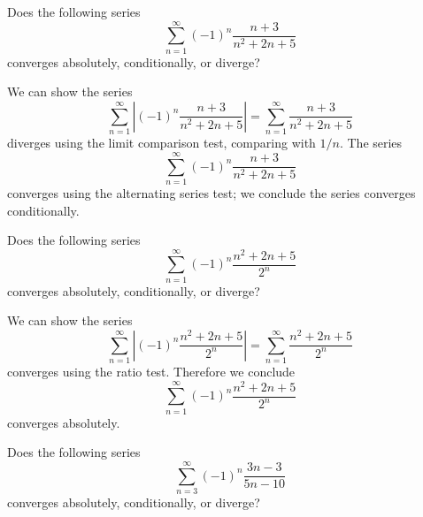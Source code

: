 \documentclass{ximera}
\begin{document}
\begin{question}
  Does the following series
  \[
  \sum_{n=1}^\infty (-1)^n\frac{n+3}{n^2+2n+5}
  \]
  converges absolutely, conditionally, or diverge?
  \begin{prompt}
    \begin{multipleChoice}
    \end{multipleChoice}
    \begin{feedback}
      We can show the series
      \[
      \sum_{n=1}^\infty \left|(-1)^n\frac{n+3}{n^2+2n+5}\right|=
      \sum_{n=1}^\infty \frac{n+3}{n^2+2n+5}
      \]
      diverges using the limit comparison test, comparing with $1/n$.
      The series
      \[
      \sum_{n=1}^\infty (-1)^n\frac{n+3}{n^2+2n+5}
      \]
      converges using the alternating series test; we conclude the
      series converges conditionally.
    \end{feedback}
  \end{prompt}
  \begin{question}
    Does the following series
    \[
    \sum_{n=1}^\infty (-1)^n\frac{n^2+2n+5}{2^n}
    \]
    converges absolutely, conditionally, or diverge?
    \begin{prompt}
      \begin{multipleChoice}
      \end{multipleChoice}
      \begin{feedback}
        We can show the series
        \[
        \sum_{n=1}^\infty \left|(-1)^n\frac{n^2+2n+5}{2^n}\right|=\sum_{n=1}^\infty \frac{n^2+2n+5}{2^n}
        \]
        converges using the ratio test.  Therefore we conclude
        \[
        \sum_{n=1}^\infty (-1)^n\frac{n^2+2n+5}{2^n}
        \]
        converges absolutely.
      \end{feedback}
    \end{prompt}
    \begin{question}
      Does the following series
      \[
      \sum_{n=3}^\infty (-1)^n\frac{3n-3}{5n-10}
      \]
      converges absolutely, conditionally, or diverge?
      \begin{prompt}
        \begin{multipleChoice}

\end{multipleChoice}
\end{prompt}
\end{question}
\end{question}
\end{question}
\end{document}
